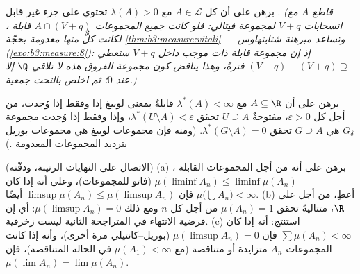 \begin{exercise}[$\star\star\star$]\label{exo:b3:measure:9}
برهن على أن كل $A \in \mathcal L$ مع $\lambda(A) > 0$ تحتوي على جزء غير
قابل . \emph{(قاطع $A$ مع انسحابات $V + q$ لمجموعة
فيتالي: فلو كانت جميع المجموعات $A \cap (V+q)$ قابلة ،
لكانت كلٌّ منها معدومة  بحجّة \cref{thm:b3:measure:vitali} --- وتساعد
مبرهنة شتاينهاوس (\cref{exo:b3:measure:8}): إذ إن مجموعة قابلة  ذات
 موجب داخل $V + q$ ستعطي $(V+q) - (V+q) \supseteq$ فترةً، وهذا يناقض كون
مجموعة الفروق هذه لا تلاقي $\Q$ إلا عند $0$؛ ثم اخلص بالتحت
جمعية.)}
\end{exercise}

\begin{exercise}[$\star\star$]\label{exo:b3:measure:10}
برهن على أن $A \subseteq \R$ مع $\lambda^*(A) < \infty$ قابلةٌ  بمعنى
لوبيغ إذا وفقط إذا وُجدت، من أجل كل $\varepsilon > 0$، مفتوحةٌ
$U \supseteq A$ تحقق $\lambda^*(U \setminus A) <
\varepsilon$، وإذا وفقط إذا وُجدت مجموعة
$G_\delta$ هي $G \supseteq A$ تحقق $\lambda^*(G\setminus A) = 0$. (ومنه فإن مجموعات
لوبيغ هي مجموعات بوريل بترديد المجموعات المعدومة .)
\end{exercise}

\begin{exercise}[$\star\star$]\label{exo:b3:measure:11}
(الاتصال على النهايات الرتيبة، ودقّته)
(a) برهن على أنه من أجل المجموعات القابلة ، $\mu(\liminf A_n) \leq
\liminf\mu(A_n)$ (فاتو
للمجموعات)، وعلى أنه إذا كان $\mu\bigl(\bigcup A_n\bigr) < \infty$ فإن $\limsup\mu(A_n) \leq \mu(\limsup A_n)$ أيضًا.
(b) أعطِ، من أجل  على $\R$، متتاليةً تحقق
$\mu(A_n) = 1$ من أجل كل $n$ ومع ذلك $\mu(\limsup A_n) = 0$: أي إن فرضية
الانتهاء في المتراجحة الثانية ليست زخرفية.
(c) استنتج: أنه إذا كان $\sum\mu(A_n) < \infty$ فإن $\mu(\limsup A_n) = 0$ (بوريل--كانتيلي مرة
أخرى)، وأنه إذا كانت المجموعات $A_n$ متزايدة أو متناقصة (مع
$\mu(A_1) < \infty$ في الحالة المتناقصة)، فإن $\mu(\lim A_n) = \lim\mu(A_n)$.
\end{exercise}

